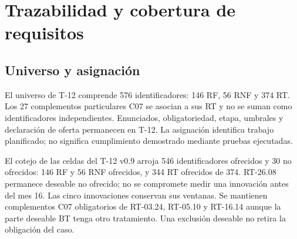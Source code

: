 \section{Trazabilidad y cobertura de requisitos}\label{sec:t14-traza}
\subsection{Universo y asignación}
El universo de T-12 comprende 576 identificadores: 146 RF, 56 RNF y 374 RT. Los 27 complementos particulares C07 se asocian a sus RT y no se suman como identificadores independientes. Enunciados, obligatoriedad, etapa, umbrales y declaración de oferta permanecen en T-12. La asignación identifica trabajo planificado; no significa cumplimiento demostrado mediante pruebas ejecutadas.

El cotejo de las celdas del T-12 v0.9 arroja 546 identificadores ofrecidos y 30 no ofrecidos: 146 RF y 56 RNF ofrecidos, y 344 RT ofrecidos de 374. RT-26.08 permanece deseable no ofrecido; no se compromete medir una innovación antes del mes 16. Las cinco innovaciones conservan sus ventanas. Se mantienen complementos C07 obligatorios de RT-03.24, RT-05.10 y RT-16.14 aunque la parte deseable BT tenga otro tratamiento. Una exclusión deseable no retira la obligación del caso.

